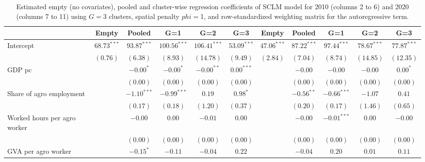 
\begin{table}
\caption{Estimated empty (no covariates), pooled and cluster-wise regression coefficients of SCLM model for 2010 (columns 2 to 6) and 2020 (columns 7 to 11) using $G=$3 clusters, spatial penalty $phi=$1, and row-standardized weighting matrix for the autoregressive term.}
\begin{center}
\begin{tabular}{l c c c c c c c c c c}
\hline
 & Empty & Pooled & G=1 & G=2 & G=3 & Empty & Pooled & G=1 & G=2 & G=3 \\
\hline
Intercept                         & $68.73^{***}$ & $93.87^{***}$ & $100.56^{***}$ & $106.41^{***}$ & $53.09^{***}$ & $47.06^{***}$ & $87.22^{***}$ & $97.44^{***}$ & $78.67^{***}$ & $77.87^{***}$ \\
                                  & $(0.76)$      & $(6.38)$      & $(8.93)$       & $(14.78)$      & $(9.49)$      & $(2.84)$      & $(7.04)$      & $(8.74)$      & $(14.85)$     & $(12.35)$     \\
GDP pc                            &               & $-0.00^{*}$   & $-0.00^{*}$    & $-0.00^{**}$   & $0.00^{***}$  &               & $-0.00$       & $-0.00$       & $-0.00$       & $0.00^{*}$    \\
                                  &               & $(0.00)$      & $(0.00)$       & $(0.00)$       & $(0.00)$      &               & $(0.00)$      & $(0.00)$      & $(0.00)$      & $(0.00)$      \\
Share of agro employment          &               & $-1.10^{***}$ & $-0.99^{***}$  & $0.19$         & $0.98^{*}$    &               & $-0.56^{**}$  & $-0.66^{***}$ & $-1.07$       & $0.41$        \\
                                  &               & $(0.17)$      & $(0.18)$       & $(1.20)$       & $(0.37)$      &               & $(0.20)$      & $(0.17)$      & $(1.46)$      & $(0.65)$      \\
Worked hours per agro worker      &               & $-0.00$       & $0.00$         & $-0.01$        & $0.00$        &               & $-0.00$       & $-0.01^{***}$ & $0.00$        & $-0.00$       \\
                                  &               & $(0.00)$      & $(0.00)$       & $(0.00)$       & $(0.00)$      &               & $(0.00)$      & $(0.00)$      & $(0.00)$      & $(0.00)$      \\
GVA per agro worker               &               & $-0.15^{*}$   & $-0.11$        & $-0.04$        & $0.22$        &               & $-0.04$       & $0.20$        & $0.01$        & $0.11$        \\

\end{tabular}
\end{center}
\end{table}
